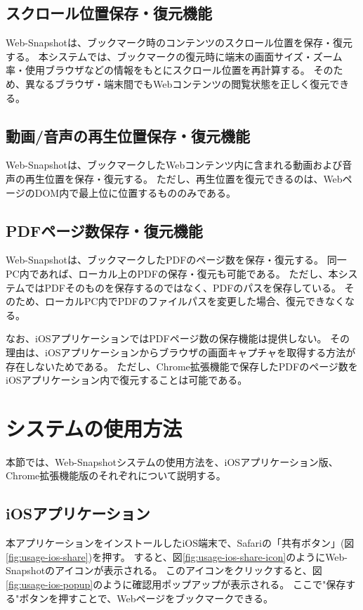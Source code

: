 \subsection{スクロール位置保存・復元機能}
Web-Snapshotは、ブックマーク時のコンテンツのスクロール位置を保存・復元する。
本システムでは、ブックマークの復元時に端末の画面サイズ・ズーム率・使用ブラウザなどの情報をもとにスクロール位置を再計算する。
そのため、異なるブラウザ・端末間でもWebコンテンツの閲覧状態を正しく復元できる。

\subsection{動画/音声の再生位置保存・復元機能}
Web-Snapshotは、ブックマークしたWebコンテンツ内に含まれる動画および音声の再生位置を保存・復元する。
ただし、再生位置を復元できるのは、WebページのDOM内で最上位に位置するもののみである。

\subsection{PDFページ数保存・復元機能}
Web-Snapshotは、ブックマークしたPDFのページ数を保存・復元する。
同一PC内であれば、ローカル上のPDFの保存・復元も可能である。
ただし、本システムではPDFそのものを保存するのではなく、PDFのパスを保存している。
そのため、ローカルPC内でPDFのファイルパスを変更した場合、復元できなくなる。

なお、iOSアプリケーションではPDFページ数の保存機能は提供しない。
その理由は、iOSアプリケーションからブラウザの画面キャプチャを取得する方法が存在しないためである。
ただし、Chrome拡張機能で保存したPDFのページ数をiOSアプリケーション内で復元することは可能である。

\section{システムの使用方法}
本節では、Web-Snapshotシステムの使用方法を、iOSアプリケーション版、Chrome拡張機能版のそれぞれについて説明する。

\subsection{iOSアプリケーション}
本アプリケーションをインストールしたiOS端末で、Safariの「共有ボタン」(図\ref{fig:usage-ios-share})を押す。
すると、図\ref{fig:usage-ios-share-icon}のようにWeb-Snapshotのアイコンが表示される。
このアイコンをクリックすると、図\ref{fig:usage-ios-popup}のように確認用ポップアップが表示される。
ここで"保存する"ボタンを押すことで、Webページをブックマークできる。

